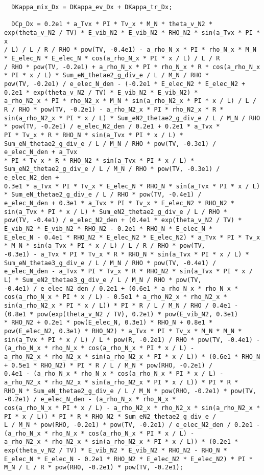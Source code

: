\documentclass[10pt]{article}
\begin{document}
\begin{scriptsize}
\begin{verbatim}
  DKappa_mix_Dx = DKappa_ev_Dx + DKappa_tr_Dx;

  DCp_Dx = 0.2e1 * a_Tvx * PI * Tv_x * M_N * theta_v_N2 * exp(theta_v_N2 / TV) * E_vib_N2 * E_vib_N2 * RHO_N2 * sin(a_Tvx * PI * x
/ L) / L / R / RHO * pow(TV, -0.4e1) - a_rho_N_x * PI * rho_N_x * M_N * E_elec_N * E_elec_N * cos(a_rho_N_x * PI * x / L) / L / R
/ RHO * pow(TV, -0.2e1) + a_rho_N_x * PI * rho_N_x * R * cos(a_rho_N_x * PI * x / L) * Sum_eN_thetae2_g_div_e / L / M_N / RHO *
pow(TV, -0.2e1) / e_elec_N_den - (-0.2e1 * E_elec_N2 * E_elec_N2 + 0.2e1 * exp(theta_v_N2 / TV) * E_vib_N2 * E_vib_N2) *
a_rho_N2_x * PI * rho_N2_x * M_N * sin(a_rho_N2_x * PI * x / L) / L / R / RHO * pow(TV, -0.2e1) - a_rho_N2_x * PI * rho_N2_x * R *
sin(a_rho_N2_x * PI * x / L) * Sum_eN2_thetae2_g_div_e / L / M_N / RHO * pow(TV, -0.2e1) / e_elec_N2_den / 0.2e1 + 0.2e1 * a_Tvx *
PI * Tv_x * R * RHO_N * sin(a_Tvx * PI * x / L) * Sum_eN_thetae2_g_div_e / L / M_N / RHO * pow(TV, -0.3e1) / e_elec_N_den + a_Tvx
* PI * Tv_x * R * RHO_N2 * sin(a_Tvx * PI * x / L) * Sum_eN2_thetae2_g_div_e / L / M_N / RHO * pow(TV, -0.3e1) / e_elec_N2_den +
0.3e1 * a_Tvx * PI * Tv_x * E_elec_N * RHO_N * sin(a_Tvx * PI * x / L) * Sum_eN_thetae2_g_div_e / L / RHO * pow(TV, -0.4e1) /
e_elec_N_den + 0.3e1 * a_Tvx * PI * Tv_x * E_elec_N2 * RHO_N2 * sin(a_Tvx * PI * x / L) * Sum_eN2_thetae2_g_div_e / L / RHO *
pow(TV, -0.4e1) / e_elec_N2_den + (0.4e1 * exp(theta_v_N2 / TV) * E_vib_N2 * E_vib_N2 * RHO_N2 - 0.2e1 * RHO_N * E_elec_N *
E_elec_N - 0.4e1 * RHO_N2 * E_elec_N2 * E_elec_N2) * a_Tvx * PI * Tv_x * M_N * sin(a_Tvx * PI * x / L) / L / R / RHO * pow(TV,
-0.3e1) - a_Tvx * PI * Tv_x * R * RHO_N * sin(a_Tvx * PI * x / L) * Sum_eN_thetae3_g_div_e / L / M_N / RHO * pow(TV, -0.4e1) /
e_elec_N_den - a_Tvx * PI * Tv_x * R * RHO_N2 * sin(a_Tvx * PI * x / L) * Sum_eN2_thetae3_g_div_e / L / M_N / RHO * pow(TV,
-0.4e1) / e_elec_N2_den / 0.2e1 + (0.6e1 * a_rho_N_x * rho_N_x * cos(a_rho_N_x * PI * x / L) - 0.5e1 * a_rho_N2_x * rho_N2_x *
sin(a_rho_N2_x * PI * x / L)) * PI * R / L / M_N / RHO / 0.4e1 - (0.8e1 * pow(exp(theta_v_N2 / TV), 0.2e1) * pow(E_vib_N2, 0.3e1)
* RHO_N2 + 0.2e1 * pow(E_elec_N, 0.3e1) * RHO_N + 0.8e1 * pow(E_elec_N2, 0.3e1) * RHO_N2) * a_Tvx * PI * Tv_x * M_N * M_N *
sin(a_Tvx * PI * x / L) / L * pow(R, -0.2e1) / RHO * pow(TV, -0.4e1) - (a_rho_N_x * rho_N_x * cos(a_rho_N_x * PI * x / L) -
a_rho_N2_x * rho_N2_x * sin(a_rho_N2_x * PI * x / L)) * (0.6e1 * RHO_N + 0.5e1 * RHO_N2) * PI * R / L / M_N * pow(RHO, -0.2e1) /
0.4e1 - (a_rho_N_x * rho_N_x * cos(a_rho_N_x * PI * x / L) - a_rho_N2_x * rho_N2_x * sin(a_rho_N2_x * PI * x / L)) * PI * R *
RHO_N * Sum_eN_thetae2_g_div_e / L / M_N * pow(RHO, -0.2e1) * pow(TV, -0.2e1) / e_elec_N_den - (a_rho_N_x * rho_N_x *
cos(a_rho_N_x * PI * x / L) - a_rho_N2_x * rho_N2_x * sin(a_rho_N2_x * PI * x / L)) * PI * R * RHO_N2 * Sum_eN2_thetae2_g_div_e /
L / M_N * pow(RHO, -0.2e1) * pow(TV, -0.2e1) / e_elec_N2_den / 0.2e1 - (a_rho_N_x * rho_N_x * cos(a_rho_N_x * PI * x / L) -
a_rho_N2_x * rho_N2_x * sin(a_rho_N2_x * PI * x / L)) * (0.2e1 * exp(theta_v_N2 / TV) * E_vib_N2 * E_vib_N2 * RHO_N2 - RHO_N *
E_elec_N * E_elec_N - 0.2e1 * RHO_N2 * E_elec_N2 * E_elec_N2) * PI * M_N / L / R * pow(RHO, -0.2e1) * pow(TV, -0.2e1);


\end{verbatim}
\end{scriptsize}
\end{document}
